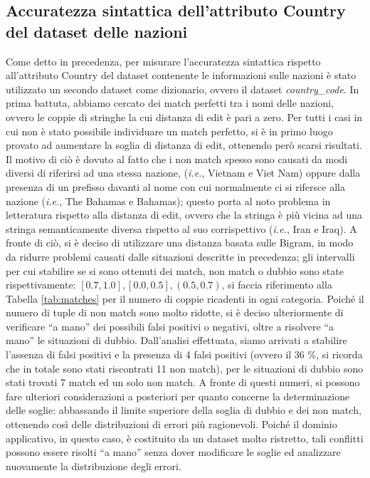 \subsection{Accuratezza sintattica dell'attributo Country del dataset delle nazioni}
Come detto in precedenza, per misurare l'accuratezza sintattica rispetto all'attributo Country del dataset contenente le informazioni sulle nazioni è stato utilizzato un secondo dataset come dizionario, ovvero il dataset \textit{country\_code}.
In prima battuta, abbiamo cercato dei match perfetti tra i nomi delle nazioni, ovvero le coppie di stringhe la cui distanza di edit è pari a zero.
Per tutti i casi in cui non è stato possibile individuare un match perfetto, si è in primo luogo provato ad aumentare la soglia di distanza di edit, ottenendo però scarsi risultati.
Il motivo di ciò è dovuto al fatto che i non match spesso sono causati da modi diversi di riferirsi ad una stessa nazione, (\textit{i.e.}, Vietnam e Viet Nam) oppure  dalla presenza di un prefisso davanti al nome con cui normalmente ci si rifersce alla nazione (\textit{i.e.}, The Bahamas e Bahamas); questo porta al noto problema in letteratura rispetto alla distanza di edit, ovvero che la stringa è più vicina ad una stringa semanticamente diversa rispetto al suo corrispettivo (\textit{i.e.}, Iran e Iraq).
A fronte di ciò, si è deciso di utilizzare una distanza basata sulle Bigram, in modo da ridurre problemi causati dalle situazioni descritte in precedenza; gli intervalli per cui stabilire se si sono ottenuti dei match, non match o dubbio sono state rispettivamente: $[0.7, 1.0], [0.0,0.5], (0.5, 0.7)$, si faccia riferimento alla Tabella \ref{tab:matches} per il numero di coppie ricadenti in ogni categoria.
Poiché il numero di tuple di non match sono molto ridotte, si è deciso ulteriormente di verificare “a mano” dei possibili falsi positivi o negativi, oltre a risolvere “a mano” le situazioni di dubbio.
Dall'analisi effettuata, siamo arrivati a stabilire l'assenza di falsi positivi e la presenza di 4 falsi positivi (ovvero il 36 \%, si ricorda che in totale sono stati riscontrati 11 non match), per le situazioni di dubbio sono stati trovati 7 match ed un solo non match.
A fronte di questi numeri, si possono fare ulteriori considerazioni a posteriori per quanto concerne la determinazione delle soglie: abbassando il limite superiore della soglia di dubbio e dei non match, ottenendo così delle distribuzioni di errori più ragionevoli. 
Poiché il dominio applicativo, in questo caso, è costituito da un dataset molto ristretto, tali conflitti possono essere risolti “a mano” senza dover modificare le soglie ed analizzare nuovamente la distribuzione degli errori. 
